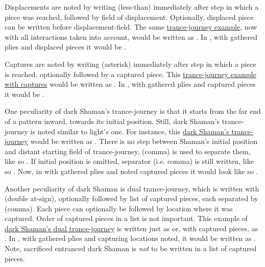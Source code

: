 Displacements are noted by writing \alg{<} (less-than) immediately after step in which a
piece was reached, followed by field of displacement. Optionally, displaced piece can be
written before displacement-field. The same
\hyperref[fig:scn_cot_57_light_light_shaman_interaction_end]{trance-journey example},
now with all interactions taken into account, would be written as
.
In , with gathered plies and displaced pieces it would be \newline
{}.

Captures are noted by writing \alg{*} (asterisk) immediately after step in which a piece
is reached, optionally followed by a captured piece. This
\hyperref[fig:scn_cot_59_dark_light_shaman_interaction_end]{trance-journey example with captures}
would be written as \newline
{}. In , with gathered plies and
captured pieces it would be \newline
{}.

One peculiarity of dark Shaman's trance-journey is that it starts from the far end
of a pattern inward, towards its initial position. Still, dark Shaman's trance-journey
is noted similar to light's one. For instance, this
\hyperref[fig:scn_cot_60_dark_dark_shaman_interaction_start]{dark Shaman's trance-journey}
would be written as .
There is no step between Shaman's initial position and distant starting field of
trance-journey, \alg{,} (comma) is used to separate them, like so
.
If initial position is omitted, separator (i.e. comma) is still written, like so
. Now, in  with gathered plies
and noted captured pieces it would look like so \newline
{}.

Another peculiarity of dark Shaman is dual trance-journey, which is written with 
(double at-sign), optionally followed by list of captured pieces, each separated by \alg{,}
(comma). Each piece can optionally be followed by location where it was captured. Order of
captured pieces in a list is not important. This example of
\hyperref[fig:scn_cot_62_dark_dark_shaman_double_interaction_start]{dark Shaman's dual trance-journey}
is written just as  or, with captured pieces, as
. In , with gathered plies and capturing locations noted,
it would be written as \newline
{} \newline
{}. \newline
Note, sacrificed entranced dark Shaman is \emph{not} to be written in a list of captured
pieces.

